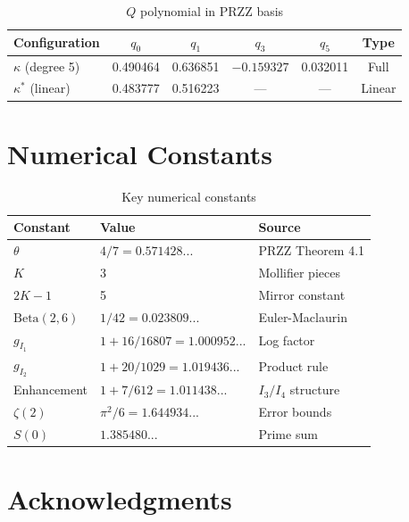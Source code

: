 \documentclass[11pt]{article}
\begin{document}
\begin{table}[h]
\centering
\caption{$Q$ polynomial in PRZZ basis}
\begin{tabular}{lccccc}
\toprule
Configuration & $q_0$ & $q_1$ & $q_3$ & $q_5$ & Type \\
\midrule
$\kappa$ (degree 5) & 0.490464 & 0.636851 & $-0.159327$ & 0.032011 & Full \\
$\kappa^*$ (linear) & 0.483777 & 0.516223 & --- & --- & Linear \\
\bottomrule
\end{tabular}
\end{table}

\section{Numerical Constants}
\label{app:constants}

\begin{table}[h]
\centering
\caption{Key numerical constants}
\begin{tabular}{lll}
\toprule
Constant & Value & Source \\
\midrule
$\theta$ & $4/7 = 0.571428...$ & PRZZ Theorem 4.1 \\
$K$ & 3 & Mollifier pieces \\
$2K-1$ & 5 & Mirror constant \\
$\text{Beta}(2,6)$ & $1/42 = 0.023809...$ & Euler-Maclaurin \\
$g_{I_1}$ & $1 + 16/16807 = 1.000952...$ & Log factor \\
$g_{I_2}$ & $1 + 20/1029 = 1.019436...$ & Product rule \\
Enhancement & $1 + 7/612 = 1.011438...$ & $I_3/I_4$ structure \\
$\zeta(2)$ & $\pi^2/6 = 1.644934...$ & Error bounds \\
$S(0)$ & $1.385480...$ & Prime sum \\
\bottomrule
\end{tabular}
\end{table}

\section{Acknowledgments}
\label{app:acknowledgments}
\end{document}
